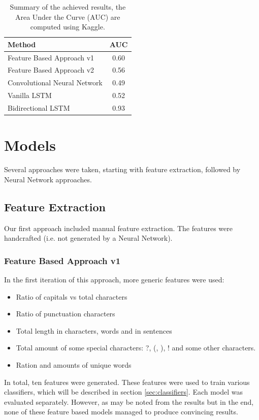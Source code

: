 \documentclass[10pt, a4paper]{article}
\begin{document}
\begin{multicols}{2}
		\begin{table}[t]
			\centering
			\begin{tabular}{l|c}
				\toprule
				\textbf{Method} & \textbf{AUC} \\
				\midrule
				Feature Based Approach v1 & 0.60   \\
				Feature Based Approach v2 & 0.56 \\
				Convolutional Neural Network & 0.49 \\
				Vanilla LSTM & 0.52 \\
				Bidirectional LSTM & 0.93 \\
				\bottomrule
			\end{tabular}
			\caption{Summary of the achieved results, the Area Under the Curve (AUC) are computed using Kaggle.}
			\label{table:summary_results}
		\end{table}
		
		
		\section{Models}
		Several approaches were taken, starting with feature extraction, followed by Neural Network approaches.
		
		\subsection{Feature Extraction}
		Our first approach included manual feature extraction. The features were handcrafted (i.e. not generated by a Neural Network).
		\subsubsection{Feature Based Approach v1}
		In the first iteration of this approach, more generic features were used:
		\begin{itemize}
			\setlength\itemsep{0px}
			\item Ratio of capitals vs total characters
			\item Ratio of punctuation characters
			\item Total length in characters, words and in sentences
			\item Total amount of some special characters: ?, (, ), ! and some other characters.
			\item Ration and amounts of unique words		
		\end{itemize}
		In total, ten features were generated. These features were used to train various classifiers, which will be described in section \ref{sec:classifiers}. Each model was evaluated separately. However, as may be noted from the results but in the end, none of these feature based models managed to produce convincing results.
		

\end{multicols}
\end{document}
